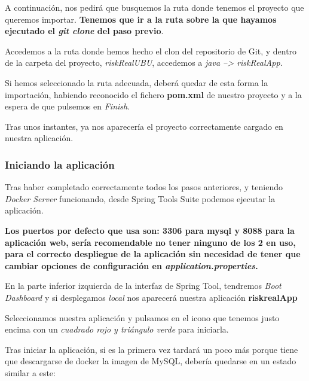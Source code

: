 
A continuación, nos pedirá que busquemos la ruta donde tenemos el proyecto que queremos importar. \textbf{Tenemos que ir a la ruta sobre la que hayamos ejecutado el \textit{git clone} del paso previo}.

Accedemos a la ruta donde hemos hecho el clon del repositorio de Git, y dentro de la carpeta del proyecto, \textit{riskRealUBU}, accedemos a \textit{java --> riskRealApp}.

Si hemos seleccionado la ruta adecuada, deberá quedar de esta forma la importación, habiendo reconocido el fichero \textbf{pom.xml} de nuestro proyecto y a la espera de que pulsemos en \textit{Finish}.


Tras unos instantes, ya nos aparecería el proyecto correctamente cargado en nuestra aplicación.


\subsubsection{Iniciando la aplicación}

Tras haber completado correctamente todos los pasos anteriores, y teniendo \textit{Docker Server} funcionando, desde Spring Tools Suite podemos ejecutar la aplicación.

\textbf{Los puertos por defecto que usa son: 3306 para mysql y 8088 para la aplicación web, sería recomendable no tener ninguno de los 2 en uso, para el correcto despliegue de la aplicación sin necesidad de tener que cambiar opciones de configuración en \textit{application.properties}.}

En la parte inferior izquierda de la interfaz de Spring Tool, tendremos \textit{Boot Dashboard} y si desplegamos \textit{local} nos aparecerá nuestra aplicación \textbf{riskrealApp}

Seleccionamos nuestra aplicación y pulsamos en el icono que tenemos justo encima con un \textit{cuadrado rojo y triángulo verde} para iniciarla.


Tras iniciar la aplicación, si es la primera vez tardará un poco más porque tiene que descargarse de docker la imagen de MySQL, debería quedarse en un estado similar a este:

